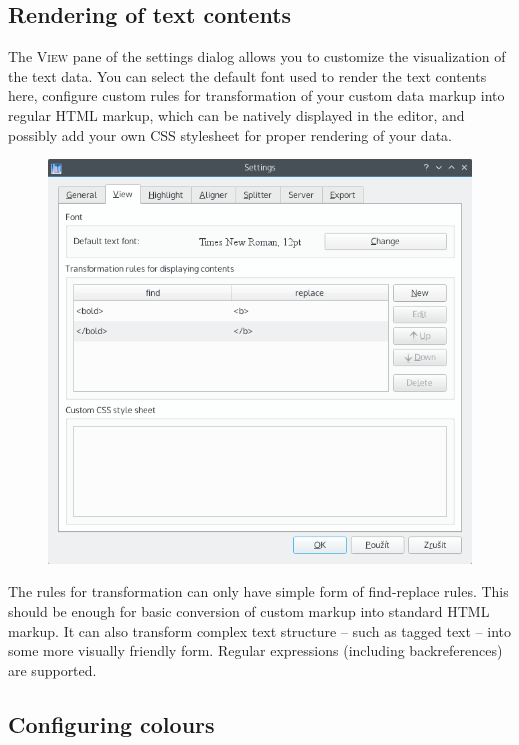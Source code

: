 \documentclass[a4paper,10pt,oneside]{book}
\newcommand{\menu}[1]{\textsc{#1}}
\begin{document}
\subsection{Rendering of text contents}

The \menu{View} pane of the settings dialog allows you to customize the visualization of the text data. You can select the default font used to render the text contents here, configure custom rules for transformation of your custom data markup into regular HTML markup, which can be natively displayed in the editor, and possibly add your own CSS stylesheet for proper rendering of your data.

\begin{figure}[htb]
 \includegraphics[width=\textwidth]{screenshots/settings_view.png}
\end{figure}

The rules for transformation can only have simple form of find-replace rules. This should be enough for basic conversion of custom markup into standard HTML markup. It can also transform complex text structure -- such as tagged text -- into some more visually friendly form. Regular expressions (including backreferences) are supported.

\subsection{Configuring colours}
\end{document}

